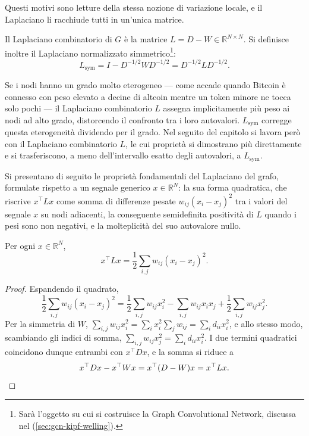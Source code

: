 Questi motivi sono letture della stessa nozione di variazione locale, e il Laplaciano li racchiude tutti in un'unica matrice.

\begin{definition}
\label{def:laplacian}
Il Laplaciano combinatorio di $G$ è la matrice $L = D - W \in \mathbb{R}^{N \times N}$. Si definisce inoltre il Laplaciano normalizzato simmetrico\footnote{Sarà l'oggetto su cui si costruisce la Graph Convolutional Network, discussa nel  (\cref{sec:gcn-kipf-welling}).}:
$$L_{\mathrm{sym}} = I - D^{-1/2}WD^{-1/2} = D^{-1/2}LD^{-1/2}.$$
\end{definition}

Se i nodi hanno un grado molto eterogeneo — come accade quando Bitcoin è connesso con peso elevato a decine di altcoin mentre un token minore ne tocca solo pochi — il Laplaciano combinatorio $L$ assegna implicitamente più peso ai nodi ad alto grado, distorcendo il confronto tra i loro autovalori. $L_{\mathrm{sym}}$ corregge questa eterogeneità dividendo per il grado. Nel seguito del capitolo si lavora però con il Laplaciano combinatorio $L$, le cui proprietà si dimostrano più direttamente e si trasferiscono, a meno dell'intervallo esatto degli autovalori, a $L_{\mathrm{sym}}$.

Si presentano di seguito le proprietà fondamentali del Laplaciano del grafo, formulate rispetto a un segnale generico $x \in \mathbb{R}^N$: la sua forma quadratica, che riscrive $x^\top L x$ come somma di differenze pesate $w_{ij}(x_i-x_j)^2$ tra i valori del segnale $x$ su nodi adiacenti, la conseguente semidefinita positività di $L$ quando i pesi sono non negativi, e la molteplicità del suo autovalore nullo.

\begin{proposition}
\label{prop:quadratic-form}
Per ogni $x \in \mathbb{R}^N$,
$$x^\top L x = \frac{1}{2}\sum_{i,j} w_{ij}(x_i - x_j)^2.$$
\end{proposition}

\begin{proof}
Espandendo il quadrato,
$$\frac12\sum_{i,j}w_{ij}(x_i-x_j)^2 = \frac12\sum_{i,j}w_{ij}x_i^2 - \sum_{i,j}w_{ij}x_ix_j + \frac12\sum_{i,j}w_{ij}x_j^2.$$
Per la simmetria di $W$, $\sum_{i,j}w_{ij}x_i^2 = \sum_i x_i^2 \sum_j w_{ij} = \sum_i d_{ii}x_i^2$, e allo stesso modo, scambiando gli indici di somma, $\sum_{i,j}w_{ij}x_j^2 = \sum_i d_{ii}x_i^2$. I due termini quadratici coincidono dunque entrambi con $x^\top Dx$, e la somma si riduce a
\begin{equation*}
x^\top Dx - x^\top Wx = x^\top(D-W)x = x^\top Lx. \qedhere
\end{equation*}
\end{proof}

